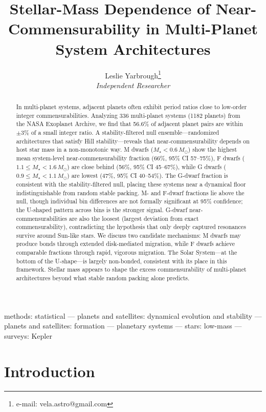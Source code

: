 \documentclass[twocolumn,usenatbib]{mnras}
\title[Stellar mass and near-commensurability]{Stellar-Mass Dependence of Near-Commensurability in Multi-Planet
System Architectures}
\author[]{Leslie Yarbrough\thanks{e-mail: vela.astro@gmail.com}
\\[4pt]
\textit{Independent Researcher}}
\begin{document}
\label{firstpage}

\maketitle

\begin{abstract}
In multi-planet systems, adjacent planets often exhibit period ratios close to
low-order integer commensurabilities. Analyzing 336 multi-planet systems (1182
planets) from the NASA Exoplanet Archive, we find that 56.6\% of adjacent
planet pairs are within $\pm 3\%$ of a small integer ratio. A
stability-filtered null ensemble---randomized architectures that satisfy Hill
stability---reveals that near-commensurability depends on
host star mass in a non-monotonic way. M dwarfs
($M_\star < 0.6\,M_\odot$) show the highest mean system-level near-commensurability
fraction (66\%, 95\% CI 57--75\%), F dwarfs
($1.1 \leq M_\star < 1.6\,M_\odot$) are
close behind (56\%, 95\% CI 45--67\%), while G dwarfs
($0.9 \leq M_\star < 1.1\,M_\odot$) are lowest (47\%, 95\% CI 40--54\%).
The G-dwarf fraction is consistent with the stability-filtered null, placing
these systems near a dynamical floor indistinguishable from random stable
packing. M- and F-dwarf fractions lie above the null, though individual bin
differences are not formally significant at 95\% confidence; the U-shaped
pattern across bins is the stronger signal. G-dwarf near-commensurabilities are
also the loosest (largest deviation from exact commensurability),
contradicting the hypothesis that only deeply captured resonances survive
around Sun-like stars. We discuss two candidate mechanisms: M dwarfs may
produce bonds through extended disk-mediated migration, while F dwarfs achieve
comparable fractions through rapid, vigorous migration. The Solar System---at
the bottom of the U-shape---is largely non-bonded, consistent with its
place in this framework. Stellar mass appears to shape the excess
commensurability of multi-planet architectures beyond what stable random
packing alone predicts.
\end{abstract}

\begin{keywords}
methods: statistical --- planets and satellites: dynamical evolution and
stability --- planets and satellites: formation --- planetary systems ---
stars: low-mass --- surveys: Kepler
\end{keywords}

\section{Introduction}
\label{sec:intro}
\end{document}
